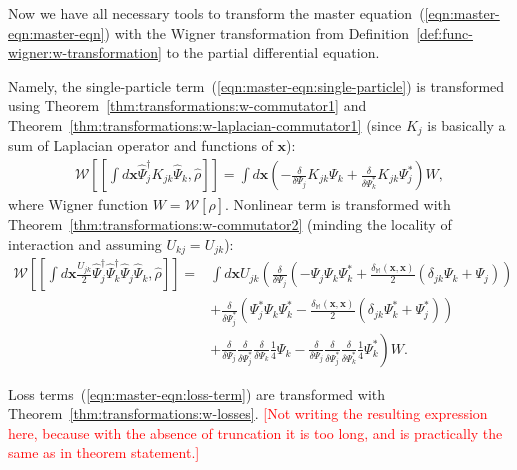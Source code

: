 \documentclass[12pt,aip,jmp,amssymb,amsmath]{revtex4-1}
\newcommand{\todo}[1]{\textcolor{red}{[#1]}}
\newcommand{\xvec}{\boldsymbol{x}}
\newcommand{\Psiop}{\hat{\Psi}}
\newcommand{\restbasis}{\mathbb{M}}
\newcommand{\eqnref}[1]{(\ref{eqn:#1})}
\newcommand{\thmref}[1]{Theorem~\ref{thm:#1}}
\newcommand{\defref}[1]{Definition~\ref{def:#1}}
\begin{document}
Now we have all necessary tools to transform the master equation~\eqnref{master-eqn:master-eqn} with the Wigner transformation from \defref{func-wigner:w-transformation} to the partial differential equation.

Namely, the single-particle term~\eqnref{master-eqn:single-particle} is transformed using \thmref{transformations:w-commutator1} and \thmref{transformations:w-laplacian-commutator1} (since $K_j$ is basically a sum of Laplacian operator and functions of $\xvec$):
\begin{equation}\begin{split}
    \mathcal{W} \left[ [ \int d\xvec \Psiop_j^\dagger K_{jk} \Psiop_k, \hat{\rho} ] \right]
    = \int d\xvec \left(
            - \frac{\delta}{\delta \Psi_j} K_{jk} \Psi_k
            + \frac{\delta}{\delta \Psi_k^*} K_{jk} \Psi_j^*
        \right)
        W,
\end{split}\end{equation}
where Wigner function $W = \mathcal{W}[\hat{\rho}]$.
Nonlinear term is transformed with \thmref{transformations:w-commutator2} (minding the locality of interaction and assuming $U_{kj} = U_{jk}$):
\begin{equation}\begin{split}
    \mathcal{W} \left[
        [
            \int d\xvec \frac{U_{jk}}{2}
                \Psiop_j^\dagger \Psiop_k^\dagger \Psiop_j \Psiop_k,
            \hat{\rho}
        ]
    \right]
    = & \int d\xvec U_{jk} \left(
        \frac{\delta}{\delta \Psi_j} \left(
            - \Psi_j \Psi_k \Psi_k^*
            + \frac{\delta_{\restbasis}(\xvec, \xvec)}{2} ( \delta_{jk} \Psi_k + \Psi_j )
        \right) \right. \\
    &   \left. + \frac{\delta}{\delta \Psi_j^*} \left(
            \Psi_j^* \Psi_k \Psi_k^*
            - \frac{\delta_{\restbasis}(\xvec, \xvec)}{2} ( \delta_{jk} \Psi_k^* + \Psi_j^* )
        \right) \right. \\
    &   \left.
            + \frac{\delta}{\delta \Psi_j}
            \frac{\delta}{\delta \Psi_j^*}
            \frac{\delta}{\delta \Psi_k}
            \frac{1}{4} \Psi_k
            - \frac{\delta}{\delta \Psi_j}
            \frac{\delta}{\delta \Psi_j^*}
            \frac{\delta}{\delta \Psi_k^*}
            \frac{1}{4} \Psi_k^*
        \right) W.
\end{split}\end{equation}

Loss terms~\eqnref{master-eqn:loss-term} are transformed with \thmref{transformations:w-losses}.
\todo{Not writing the resulting expression here, because with the absence of truncation it is too long, and is practically the same as in theorem statement.}
\end{document}
